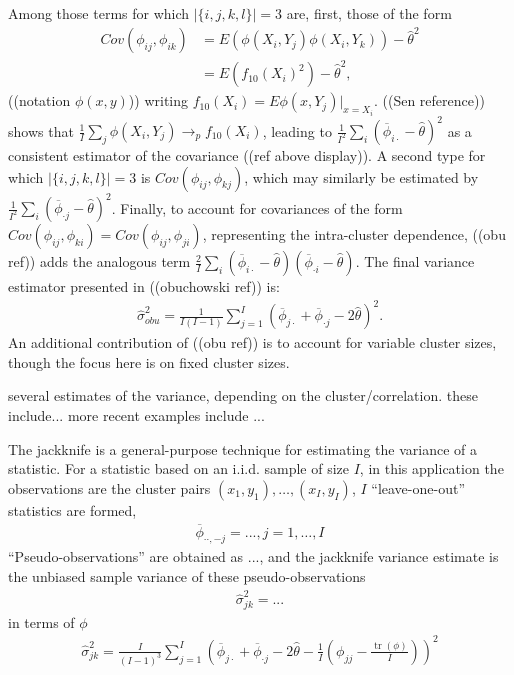 \documentclass{article}
\DeclareMathOperator{\tr}{tr}
\newcommand{\E}{E}
\newcommand{\cov}{Cov}
\newcommand{\I}{I}
\newcommand{\rowmean}[1]{\overline{\phi}_{#1\cdot}}
\newcommand{\colmean}[1]{\overline{\phi}_{\cdot #1}}
\begin{document}
\begin{enumerate}
\begin{enumerate}
  Among those terms for which $|\{i,j,k,l\}|=3$ are, first, those of the form
  \begin{align}
    \cov(\phi_{ij},\phi_{ik}) &= \E (\phi(X_i,Y_j)\phi(X_i,Y_k)) - \hat\theta^2\\
    &= \E (f_{10}(X_i)^2) - \hat\theta^2,
  \end{align}
  ((notation $\phi(x,y)$)) writing
  $f_{10}(X_i)=\E\phi(x,Y_j) \vert_{x=X_i}$. ((Sen reference)) shows
  that $\frac{1}{\I}\sum_j \phi(X_i,Y_j)\to_p f_{10}(X_i)$, leading to
  $\frac{1}{\I^2}\sum_i(\rowmean{i}-\hat\theta)^2$ as a consistent
  estimator of the covariance ((ref above display)). A second type for
  which $|\{i,j,k,l\}|=3$ is $\cov(\phi_{ij},\phi_{kj})$, which may
  similarly be estimated by
  $\frac{1}{\I^2}\sum_i(\colmean{j}-\hat\theta)^2$. Finally, to
  account for covariances of the form
  $\cov(\phi_{ij},\phi_{ki})=\cov(\phi_{ij},\phi_{ji})$, representing
  the intra-cluster dependence, ((obu ref)) adds the analogous term
  $\frac{2}{\I}\sum_i(\rowmean{i}-\hat\theta)(\colmean{i}-\hat\theta)$. The final variance estimator presented in ((obuchowski ref)) is:
  \begin{align}
    \hat\sigma^2_{obu}=\frac{1}{\I(\I-1)}\sum_{j=1}^{\I}(\rowmean{j} + \colmean{j} - 2\hat{\theta})^2.
  \end{align}
  An additional contribution of ((obu ref)) is to account for variable
  cluster sizes, though the focus here is on fixed cluster sizes.
  
  several estimates of the variance, depending on the
  cluster/correlation. these include... more recent examples include
  ...

  The jackknife is a general-purpose technique for estimating the
  variance of a statistic. For a statistic based on an i.i.d. sample
  of size $\I$, in this application the
  observations are the cluster pairs
  $(x_1,y_1),\ldots,(x_{\I},y_{\I})$, $\I$ ``leave-one-out'' statistics are formed,%
  \begin{align}
    \overline{\phi}_{\cdot \cdot, -j} = ..., j=1,\ldots,\I
  \end{align}
  ``Pseudo-observations'' are obtained as $...$, and the jackknife variance estimate is the unbiased sample variance of these pseudo-observations
  \begin{align}
    \hat\sigma^2_{jk}=...
  \end{align}
  in terms of $\phi$
  \begin{align}
    \hat\sigma^2_{jk}=\frac{\I}{(\I-1)^3}\sum_{j=1}^{\I}\left(\rowmean{j} + \colmean{j} - 2\hat{\theta} - \frac{1}{\I}\left(\phi_{jj}-\frac{\tr(\phi)}{\I}\right)\right)^2
  \end{align}


\end{enumerate}
\end{enumerate}
\end{document}

